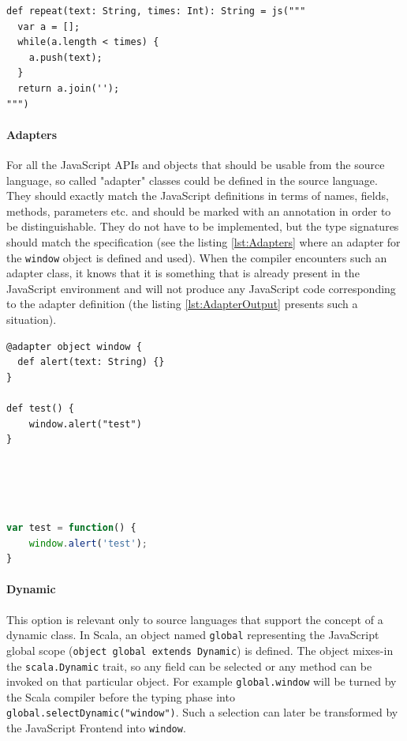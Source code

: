 \documentclass[12pt,a4paper]{report}
\begin{document}
\begin{lstlisting}[caption={Native code block example.},label={lst:NativeCodeBlock}]
def repeat(text: String, times: Int): String = js("""
  var a = [];
  while(a.length < times) {
    a.push(text);
  }
  return a.join('');
""")
\end{lstlisting}

\paragraph{Adapters} For all the JavaScript APIs and objects that should be usable from the source language, so called "adapter" classes could be defined in the source language. They should exactly match the JavaScript definitions in terms of names, fields, methods, parameters etc. and should be marked with an annotation in order to be distinguishable. They do not have to be implemented, but the type signatures should match the specification (see the listing \ref{lst:Adapters} where an adapter for the \texttt{window} object is defined and used). When the compiler encounters such an adapter class, it knows that it is something that is already present in the JavaScript environment and will not produce any JavaScript code corresponding to the adapter definition (the listing \ref{lst:AdapterOutput} presents such a situation).

\begin{center}
\begin{minipage}{.48\textwidth}
  \begin{lstlisting}[caption={Adapter definition and usage example.},label={lst:Adapters}]
@adapter object window {
  def alert(text: String) {}
}

def test() {
	window.alert("test")
}
  \end{lstlisting}
\end{minipage}
\hfill
\begin{minipage}{.48\textwidth}
  \begin{lstlisting}[language=JavaScript,caption={Adapter compilation output.},label={lst:AdapterOutput}]
	
	
	
	
var test = function() {
	window.alert('test');
}
  \end{lstlisting}
\end{minipage}
\end{center}



\paragraph{Dynamic} This option is relevant only to source languages that support the concept of a dynamic class. In Scala, an object named \texttt{global} representing the JavaScript global scope (\texttt{object global extends Dynamic}) is defined. The object mixes-in the \texttt{scala.Dynamic} \cite{ScalaDynamic} trait, so any field can be selected or any method can be invoked on that particular object. For example \texttt{global.window} will be turned by the Scala compiler before the typing phase into \texttt{global.selectDynamic("window")}. Such a selection can later be transformed by the JavaScript Frontend into \texttt{window}.
\end{document}
